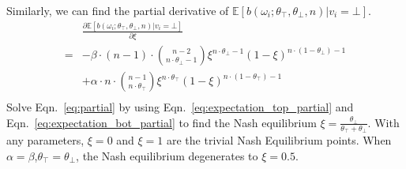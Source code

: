 \documentclass[11pt]{article}
\begin{document}
  Similarly, we can find the partial derivative of $\mathbb{E}[b(\omega_i;\theta_\top,\theta_\bot,n )| v_i=\bot]$.
  \begin{equation}
    \label{eq:expectation_bot_partial}
    \begin{aligned}
      &\frac{\partial\mathbb{E}[b(\omega_i;\theta_\top,\theta_\bot,n )| v_i=\bot]}{\partial\xi} \\
      =& -\beta\cdot (n-1)\cdot \binom{n-2}{n\cdot\theta_\bot-1}\xi^{n\cdot\theta_\bot-1}(1-\xi)^{n\cdot(1-\theta_\bot)-1} \\
      &+\alpha\cdot n \cdot \binom{n-1}{n\cdot\theta_\top}\xi^{n\cdot\theta_\top}(1-\xi)^{n\cdot(1-\theta_\top)-1}\\
    \end{aligned}
  \end{equation}
  Solve Eqn.~\ref{eq:partial} by using Eqn.~\ref{eq:expectation_top_partial} and Eqn.~\ref{eq:expectation_bot_partial} to find the Nash equilibrium $\xi=\frac{\theta_\bot}{\theta_\top+\theta_\bot}$.
  With any parameters, $\xi=0$ and $\xi=1$ are the trivial Nash Equilibrium points. When $\alpha=\beta$,$\theta_\top=\theta_\bot$, the Nash equilibrium degenerates to $\xi=0.5$.
  
\end{document}
